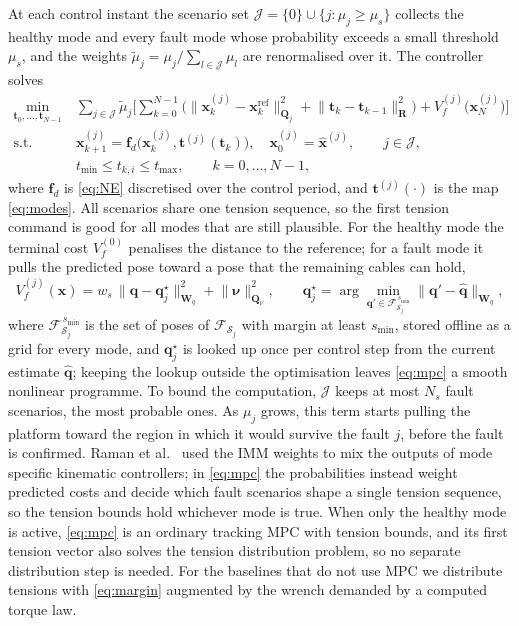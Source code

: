 \documentclass[10pt]{article}
\newcommand{\vc}[1]{\bm{#1}}
\newcommand{\mt}[1]{\mathbf{#1}}
\begin{document}
At each control instant the scenario set $\mathcal J=\{0\}\cup\{j:\mu_j\ge\mu_s\}$ collects the healthy mode and every fault mode whose probability exceeds a small threshold $\mu_s$, and the weights $\tilde\mu_j=\mu_j/\sum_{l\in\mathcal J}\mu_l$ are renormalised over it. The controller solves
\begin{equation}\label{eq:mpc}
\begin{aligned}
\min_{\vc t_0,\dots,\vc t_{N-1}}\ & \sum_{j\in\mathcal J}\tilde\mu_j\Big[\sum_{k=0}^{N-1}\big(\lVert\vc x^{(j)}_k-\vc x^{\mathrm{ref}}_k\rVert^2_{\mt Q_j}+\lVert\vc t_k-\vc t_{k-1}\rVert^2_{\mt R}\big)+V_f^{(j)}\big(\vc x^{(j)}_N\big)\Big]\\
\text{s.t.}\ & \vc x^{(j)}_{k+1}=\vc f_d\big(\vc x^{(j)}_k,\vc t^{(j)}(\vc t_k)\big),\quad \vc x^{(j)}_0=\hat{\vc x}^{(j)},\qquad j\in\mathcal J,\\
& t_{\min}\le t_{k,i}\le t_{\max},\qquad k=0,\dots,N-1,
\end{aligned}
\end{equation}
where $\vc f_d$ is \eqref{eq:NE} discretised over the control period, and $\vc t^{(j)}(\cdot)$ is the map \eqref{eq:modes}. All scenarios share one tension sequence, so the first tension command is good for all modes that are still plausible. For the healthy mode the terminal cost $V_f^{(0)}$ penalises the distance to the reference; for a fault mode it pulls the predicted pose toward a pose that the remaining cables can hold,
\begin{equation}
V_f^{(j)}(\vc x)=w_s\,\lVert\vc q-\vc q^{\star}_j\rVert^2_{\mt W_q}+\lVert\vc\nu\rVert^2_{\mt Q_\nu},\qquad
\vc q^\star_j=\arg\min_{\vc q'\in\mathcal F^{\,s_{\min}}_{\mathcal S_j}}\lVert\vc q'-\hat{\vc q}\rVert_{\mt W_q},
\end{equation}
where $\mathcal F^{\,s_{\min}}_{\mathcal S_j}$ is the set of poses of $\mathcal F_{\mathcal S_j}$ with margin at least $s_{\min}$, stored offline as a grid for every mode, and $\vc q^\star_j$ is looked up once per control step from the current estimate $\hat{\vc q}$; keeping the lookup outside the optimisation leaves \eqref{eq:mpc} a smooth nonlinear programme. To bound the computation, $\mathcal J$ keeps at most $N_s$ fault scenarios, the most probable ones. As $\mu_j$ grows, this term starts pulling the platform toward the region in which it would survive the fault $j$, before the fault is confirmed. Raman et al.\ \citep{raman2023cable} used the IMM weights to mix the outputs of mode specific kinematic controllers; in \eqref{eq:mpc} the probabilities instead weight predicted costs and decide which fault scenarios shape a single tension sequence, so the tension bounds hold whichever mode is true. When only the healthy mode is active, \eqref{eq:mpc} is an ordinary tracking MPC with tension bounds, and its first tension vector also solves the tension distribution problem, so no separate distribution step is needed. For the baselines that do not use MPC we distribute tensions with \eqref{eq:margin} augmented by the wrench demanded by a computed torque law.
\end{document}
